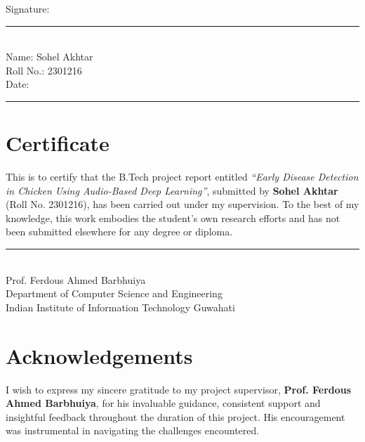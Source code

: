 \documentclass[12pt,a4paper]{report}
\begin{document}
\vspace*{4em}

\noindent
Signature: \rule{6cm}{0.4pt}\\[2em]
Name: Sohel Akhtar\\[1em]
Roll No.: 2301216\\[2em]

\noindent
Date: \rule{6cm}{0.4pt}

\clearpage

\chapter*{Certificate}
\label{sec:certificate}

\vspace*{1em}

This is to certify that the B.Tech project report entitled \emph{``Early Disease Detection in Chicken Using Audio-Based Deep Learning''}, submitted by \textbf{Sohel Akhtar} (Roll No. 2301216), has been carried out under my supervision. To the best of my knowledge, this work embodies the student's own research efforts and has not been submitted elsewhere for any degree or diploma.

\vspace*{4em}

\noindent
\rule{6cm}{0.4pt}\\
\noindent Prof. Ferdous Ahmed Barbhuiya\\
Department of Computer Science and Engineering\\
Indian Institute of Information Technology Guwahati

\clearpage

\chapter*{Acknowledgements}
\label{sec:acknowledgements}

\vspace*{1em}

I wish to express my sincere gratitude to my project supervisor, \textbf{Prof. Ferdous Ahmed Barbhuiya}, for his invaluable guidance, consistent support and insightful feedback throughout the duration of this project. His encouragement was instrumental in navigating the challenges encountered.
\end{document}
